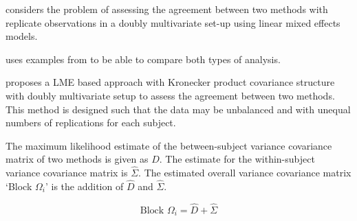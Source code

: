 \documentclass[12pt, a4paper]{report}
\theoremstyle{plain}
\theoremstyle{definition}
\theoremstyle{remark}
\begin{document}








%




















\citet{ARoy2009} considers the problem of assessing the agreement
between two methods with replicate observations in a doubly
multivariate set-up using linear mixed effects models.

\citet{ARoy2009} uses examples from \citet{BA86} to be able to
compare both types of analysis.

\citet{ARoy2009} proposes a LME based approach with Kronecker
product covariance structure with doubly multivariate setup to
assess the agreement between two methods. This method is designed
such that the data may be unbalanced and with unequal numbers of
replications for each subject.

The maximum likelihood estimate of the between-subject variance
covariance matrix of two methods is given as $D$. The estimate for
the within-subject variance covariance matrix is $\hat{\Sigma}$.
The estimated overall variance covariance matrix `Block
$\Omega_{i}$' is the addition of $\hat{D}$ and $\hat{\Sigma}$.


\begin{equation}
\mbox{Block  }\Omega_{i} = \hat{D} + \hat{\Sigma}
\end{equation}
\end{document}
